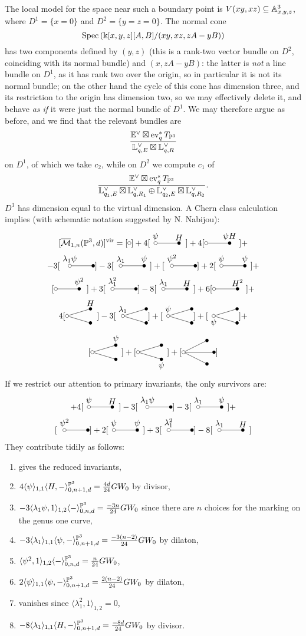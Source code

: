 The local model for the space near such a boundary point is $V(xy,xz)\subseteq\mathbb{A}^3_{x,y,z}$, where $D^1=\{x=0\}$ and $D^2=\{y=z=0\}$. The normal cone \[\operatorname{Spec}\left(\Bbbk[x,y,z][A,B]/(xy,xz,zA-yB)\right)\] has two components defined by $(y,z)$ (this is a rank-two vector bundle on $D^2$, coinciding with its normal bundle) and $(x,zA-yB)$: the latter is \emph{not} a line bundle on $D^1$, as it has rank two over the origin, so in particular it is not its normal bundle; on the other hand the cycle of this cone has dimension three, and its restriction to the origin has dimension two, so we may effectively delete it, and behave \emph{as if} it were just the normal bundle of $D^1$. We may therefore argue as before, and we find that the relevant bundles are \[\frac{\mathbb E^\vee\boxtimes \operatorname{ev}_q^*T_{\mathbb P^3}}{\mathbb L^\vee_{q,E}\boxtimes \mathbb L^\vee_{q,R}}\]
on $D^1$, of which we take $c_2$, while on $D^2$ we compute $c_1$ of \[\frac{\mathbb E^\vee\boxtimes \operatorname{ev}_q^*T_{\mathbb P^3}}{\mathbb L^\vee_{q_1,E}\boxtimes \mathbb L^\vee_{q,R_1}\oplus\mathbb L^\vee_{q_2,E}\boxtimes \mathbb L^\vee_{q,R_2}}.\]
$D^3$ has dimension equal to the virtual dimension. A Chern class calculation implies (with schematic notation suggested by N. Nabijou):
\begin{multline*}
 \virt{\M{1}{n}{\PP^3}{d}}=[\reduced]+ 4[\Dunouno]+4[\Dunodue]+\\
 -3[\Dunotre]-3[\Dunoquat]+[\Dunocin]+2[\Dunosei]+\\
 [\Dunoset]+3[\Dunoott]-8[\Dunonov]+6[\Dunodiec]+\\
 4[\Ddueuno]-3[\Dduedue]+[\Dduetre]+[\Dduequat]+\\
 [\Dduecin]+[\Dduesei]+[\Dtre]
\end{multline*}
If we restrict our attention to primary invariants, the only survivors are:
\begin{multline*}
 [\reduced]+ 4[\Dunouno]-3[\Dunotre]-3[\Dunoquat]+\\
 [\Dunocin]+2[\Dunosei]+3[\Dunoott]-8[\Dunonov]
\end{multline*}
They contribute tidily as follows:
\begin{enumerate}
 \item gives the reduced invariants,
 \item $4\langle\psi\rangle_{1,1}\langle H,-\rangle^{\mathbb P^3}_{0,n+1,d}=\frac{4d}{24} GW_0$ by divisor,
 \item $-3\langle\lambda_1\psi,1\rangle_{1,2}\langle -\rangle^{\mathbb P^3}_{0,n,d}=\frac{-3n}{24} GW_0$ since there are $n$ choices for the marking on the genus one curve,
 \item $-3\langle\lambda_1\rangle_{1,1}\langle \psi,-\rangle^{\mathbb P^3}_{0,n+1,d}=\frac{-3(n-2)}{24} GW_0$ by dilaton,
 \item $\langle\psi^2,1\rangle_{1,2}\langle -\rangle^{\mathbb P^3}_{0,n,d}=\frac{n}{24} GW_0$,
 \item $2\langle\psi\rangle_{1,1}\langle \psi,-\rangle^{\mathbb P^3}_{0,n+1,d}=\frac{2(n-2)}{24} GW_0$ by dilaton,
 \item vanishes since $\langle\lambda_1^2,1\rangle_{1,2}=0$,
 \item $-8\langle\lambda_1\rangle_{1,1}\langle H,-\rangle^{\mathbb P^3}_{0,n+1,d}=\frac{-8d}{24} GW_0$ by divisor.
\end{enumerate}
